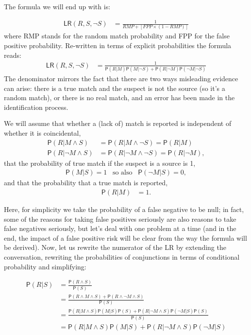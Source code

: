 \documentclass[
  10pt,
  dvipsnames,enabledeprecatedfontcommands]{scrartcl}
\newcommand{\n}{\neg}
\newcommand{\et}{\wedge}
\newcommand{\pr}[1]{\mathsf{P}(#1)}
\begin{document}
The formula we will end up with is:

\begin{align}
\tag{FPP-LR} \mathsf{LR}(R, S, \n S) & = \frac{1}{RMP + [ FPP \times (1-RMP)]}
\end{align} \noindent where RMP stands for the random match probability
and FPP for the false positive probability. Re-written in terms of
explicit probabilities the formula reads: \begin{align*}
\mathsf{LR}(R,S, \n S) & = \frac{1}
{\pr{R \vert  M}\pr{ M \vert \n S} + \pr{R \vert \n M}\pr{\n M \vert \n S}}
\end{align*} \noindent The denominator mirrors the fact that there are
two ways misleading evidence can arise: there is a true match and the
suspect is not the source (so it's a random match), or there is no real
match, and an error has been made in the identification process.

We will assume that whether a (lack of) match is reported is independent
of whether it is coincidental, \begin{align}
\label{eq:indOnS}
\pr{R \vert M \et S} & = \pr{R \vert M \et \n S} = \pr{R \vert M}
\\ \nonumber
\pr{R \vert \n M \et S} & = \pr{R \vert\n M \et \n S} = \pr{R \vert \n M},
\end{align} \noindent  that the probability of true match if the suspect
is a source is 1, \begin{align}
\label{eq:ifSthenM}
\pr{M\vert S} = 1  \,\,\, \mbox{ so also } \,\,\, \pr{\n M \vert S}=0,
\end{align} \noindent and that the probability that a true match is
reported, \begin{align}
\label{eq:fnNull}
\pr{R \vert M} & = 1.
\end{align}

Here, for simplicity we take the probability of a false negative to be
null; in fact, some of the reasons for taking false positives seriously
are also reasons to take false negatives seriously, but let's deal with
one problem at a time (and in the end, the impact of a false positive
risk will be clear from the way the formula will be derived). Now, let
us rewrite the numerator of the LR by extending the conversation,
rewriting the probabilities of conjunctions in terms of conditional
probability and simplifying:

\begin{align}
\label{eq:numer}
\pr{R\vert S} & = \frac{\pr{R\et S}}{\pr{S}} \\ \nonumber
& = \frac{\pr{R \et M \et S} + \pr{R \et \n M \et S}}
{\pr{S}}  \\ \nonumber
& = \frac{\pr{R \vert M \et S}\pr{M \vert S}\pr{S} + \pr{R \vert \n M \et S}\pr{\n M \vert S}\pr{S}}
{\pr{S}}  \\ \nonumber 
& = \pr{R \vert M \et S}\pr{M \vert S} + \pr{R \vert \n M \et S}\pr{\n M \vert S}
\end{align}
\end{document}
